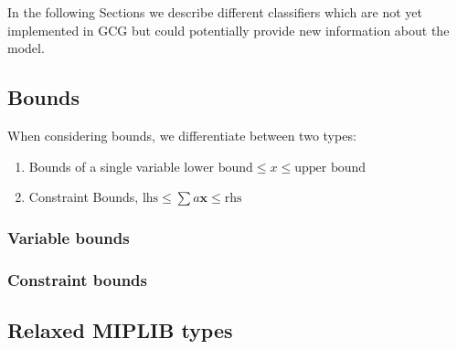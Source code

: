 		In the following Sections we describe different classifiers which are not yet implemented in \ac{GCG} but could potentially provide new information about the model.
		
		\subsection{Bounds}
			
			When considering bounds, we differentiate between two types:
			\begin{enumerate}
				\item Bounds of a single variable $\text{lower bound} \leq x \leq \text{upper bound}$
				\item Constraint Bounds, $\text{lhs} \leq \sum a \mathbf{x} \leq \text{rhs}$
			\end{enumerate}
			
			\subsubsection{Variable bounds}
			
				
				
			\subsubsection{Constraint bounds}
			
			\clearpage
		
		\subsection{Relaxed MIPLIB types}
			
